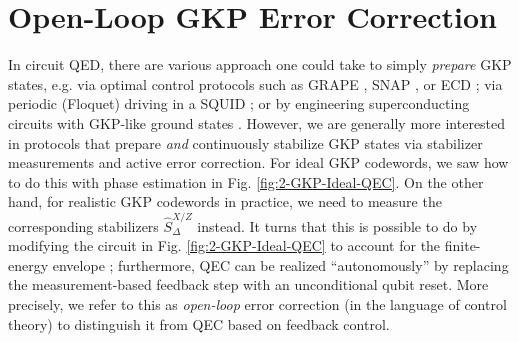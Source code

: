 \section{Open-Loop GKP Error Correction}

In circuit QED, there are various approach one could take to simply \textit{prepare} GKP states, e.g. via optimal control protocols such as GRAPE \cite{khaneja2005grape, reinhold2019thesis}, SNAP \cite{krastanov2015-SNAP, heeres2015-SNAP, fosel2020-SNAP}, or ECD \cite{eickbusch2022-ECD}; via periodic (Floquet) driving in a SQUID \cite{gkp-periodic-drive2024}; or by engineering superconducting circuits with GKP-like ground states \cite{rymarz2021hardwaregkp}. However, we are generally more interested in protocols that prepare \textit{and} continuously stabilize GKP states via stabilizer measurements and active error correction. For ideal GKP codewords, we saw how to do this with phase estimation in Fig. \ref{fig:2-GKP-Ideal-QEC}. On the other hand, for realistic GKP codewords in practice, we need to measure the corresponding stabilizers $\hat{S}_\Delta^{X/Z}$ instead. It turns that this is possible to do by modifying the circuit in Fig. \ref{fig:2-GKP-Ideal-QEC} to account for the finite-energy envelope \cite{fluhmann2019gkp-expt, campagne2020gkp-expt, royer2020gkp, deneeve2022gkp-expt}; furthermore, QEC can be realized ``autonomously'' by replacing the measurement-based feedback step with an unconditional qubit reset. More precisely, we refer to this as \textit{open-loop} error correction (in the language of control theory) to distinguish it from QEC based on feedback control.

